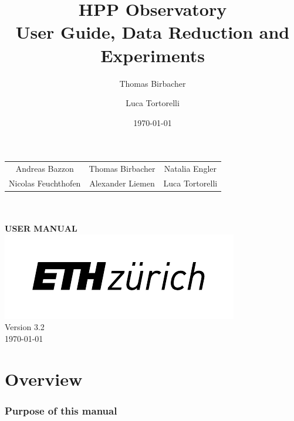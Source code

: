 \documentclass[a4paper, 11pt, fleqn]{memoir}
\begin{document}

\date{\today}
\author{Thomas Birbacher \and Luca Tortorelli}
\title{HPP Observatory \\ User Guide, Data Reduction and Experiments}


\begin{titlingpage}
    \begin{center}
        \vspace{4cm}
        {\large\bfseries
        \begin{tabular}{ccc}
            Andreas Bazzon & Thomas Birbacher & Natalia Engler\\
            Nicolas Feuchthofen & Alexander Liemen & Luca Tortorelli
        \end{tabular}
        }\\
        \vspace{3cm}
        {}\\
        \vspace{0.6cm}
        {\LARGE\bfseries {} USER MANUAL}\\
        \vfill
        \includegraphics{eth-logo}\\
        Version 3.2\\
        \today
    \end{center}
\end{titlingpage}

\newcommand{\software}[1]{\texttt{#1}}

\frontmatter

\chapter{Overview}

\subsection*{Purpose of this manual}
\end{document}
